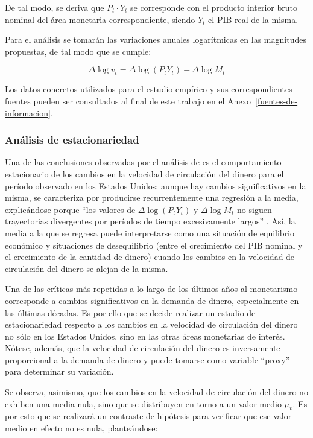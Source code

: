 \documentclass[titlepage, 12pt]{article}
\begin{document}
De tal modo, se deriva que $P_t\cdot Y_t$ se corresponde con el producto interior bruto nominal del área monetaria correspondiente, siendo $Y_t$ el PIB real de la misma.

Para el análisis se tomarán las variaciones anuales logarítmicas en las magnitudes propuestas, de tal modo que se cumple:

\begin{equation}
    \Delta\log{v_t}=\Delta\log{\left(P_tY_t\right)}-\Delta\log{M_t}
\end{equation}

Los datos concretos utilizados para el estudio empírico y sus correspondientes fuentes pueden ser consultados al final de este trabajo en el Anexo~\ref{fuentes-de-informacion}.

\subsubsection{Análisis de estacionariedad}

Una de las conclusiones observadas por el análisis de \cite{castaneda2023} es el comportamiento estacionario de los cambios en la velocidad de circulación del dinero para el período observado en los Estados Unidos: aunque hay cambios significativos en la misma, se caracteriza por producirse recurrentemente una regresión a la media, explicándose porque “los valores de $\Delta\log{\left(P_tY_t\right)}$ y $\Delta\log{M_t}$ no siguen trayectorias divergentes por períodos de tiempo excesivamente largos” \autocite[8]{castaneda2023}. Así, la media a la que se regresa puede interpretarse como una situación de equilibrio económico y situaciones de desequilibrio (entre el crecimiento del PIB nominal y el crecimiento de la cantidad de dinero) cuando los cambios en la velocidad de circulación del dinero se alejan de la misma.

Una de las críticas más repetidas a lo largo de los últimos años al monetarismo corresponde a cambios significativos en la demanda de dinero, especialmente en las últimas décadas. Es por ello que se decide realizar un estudio de estacionariedad respecto a los cambios en la velocidad de circulación del dinero no sólo en los Estados Unidos, sino en las otras áreas monetarias de interés. Nótese, además, que la velocidad de circulación del dinero es inversamente proporcional a la demanda de dinero y puede tomarse como variable \enquote{proxy} para determinar su variación.

Se observa, asimismo, que los cambios en la velocidad de circulación del dinero no exhiben una media nula, sino que se distribuyen en torno a un valor medio $\mu_v$. Es por esto que se realizará un contraste de hipótesis para verificar que ese valor medio en efecto no es nula, planteándose:
\end{document}
